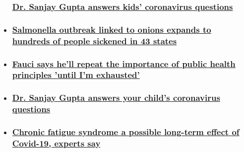 \begin{itemize}
{  \subsubsection{\texorpdfstring{\href{/2020/08/08/health/gupta-kids-corona-questions-wellness/index.html}{Dr.
  Sanjay Gupta answers kids' coronavirus
  questions}}{Dr. Sanjay Gupta answers kids' coronavirus questions}}\label{dr-sanjay-gupta-answers-kids-coronavirus-questions}}
\item
  \hypertarget{salmonella-outbreak-linked-to-onions-expands-to-hundreds-of-people-sickened-in-43-states}{%
  \subsubsection{\texorpdfstring{\href{/2020/08/08/health/onions-salmonella-outbreak/index.html}{Salmonella
  outbreak linked to onions expands to hundreds of people sickened in 43
  states}}{Salmonella outbreak linked to onions expands to hundreds of people sickened in 43 states}}\label{salmonella-outbreak-linked-to-onions-expands-to-hundreds-of-people-sickened-in-43-states}}
\item
  \hypertarget{fauci-says-hell-repeat-the-importance-of-public-health-principles-until-im-exhausted}{%
  \subsubsection{\texorpdfstring{\href{/2020/08/07/health/us-coronavirus-friday/index.html}{Fauci
  says he'll repeat the importance of public health principles 'until
  I'm
  exhausted'}}{Fauci says he'll repeat the importance of public health principles 'until I'm exhausted'}}\label{fauci-says-hell-repeat-the-importance-of-public-health-principles-until-im-exhausted}}
\item
  \hypertarget{dr-sanjay-gupta-answers-your-childs-coronavirus-questions}{%
  \subsubsection{\texorpdfstring{\href{/2020/08/07/health/coronavirus-kid-questions-gupta/index.html}{Dr.
  Sanjay Gupta answers your child's coronavirus
  questions}}{Dr. Sanjay Gupta answers your child's coronavirus questions}}\label{dr-sanjay-gupta-answers-your-childs-coronavirus-questions}}
\item
  \hypertarget{chronic-fatigue-syndrome-a-possible-long-term-effect-of-covid-19-experts-say}{%
  \subsubsection{\texorpdfstring{\href{/2020/08/07/health/chronic-fatigue-syndrome-covid-19-survivors-wellness/index.html}{Chronic
  fatigue syndrome a possible long-term effect of Covid-19, experts
  say}}{Chronic fatigue syndrome a possible long-term effect of Covid-19, experts say}}\label{chronic-fatigue-syndrome-a-possible-long-term-effect-of-covid-19-experts-say}}
\end{itemize}

